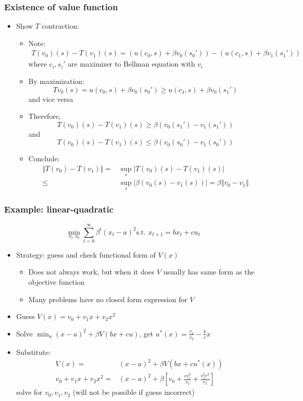 \documentclass[compress]{beamer}
\newcommand{\norm}[1]{\left\Vert {#1} \right\Vert}
\begin{document}
\begin{frame}  \frametitle{Existence of value function}
  \begin{itemize}
  \item Show $T$ contraction: 
    \begin{itemize}
    \item Note:
      \begin{align*}
        T(v_0)(s)-T(v_1)(s) =  \left(u(c_0,s) + \beta v_0(s_0')  \right) -
        \left(u(c_1,s) + \beta v_1(s_1')  \right)
      \end{align*} 
      where $c_i,s_i'$ are maximizer to Bellman equation with $v_i$
    \item By maximization: 
      \[ T v_0 (s) = u(c_0,s) + \beta v_0(s_0')  \geq u(c_1,s) + \beta
      v_0(s_1') \] 
      and vice versa
    \item 
      Therefore, 
      \[ T(v_0)(s) - T(v_1)(s) \geq \beta (v_0(s_1') - v_1(s_1')) \]
      and
      \[ T(v_0)(s)-T(v_1)(s) \leq \beta (v_0(s_0') - v_1(s_0'))  \]
    \item Conclude:
      \begin{align*}
        \norm{T(v_0)-T(v_1)} = & \sup_{s} \left\vert T(v_0)(s)-T(v_1)(s) \right\vert \\
        \leq & \sup_s \left\vert \beta(v_0(s) -v_1(s)) \right\vert =
        \beta \norm{v_0 - v_1}
      \end{align*}
    \end{itemize}
  \end{itemize}
\end{frame}

\begin{frame} \frametitle{Example: linear-quadratic}
  \[ \min_{x_t,u_t} \sum_{t=0}^\infty \beta^t (x_t - a)^2 \text{
    s.t. } x_{t+1} = b x_t + c u_t \]
  \begin{itemize}
  \item Strategy: guess and check functional form of $V(x)$ 
    \begin{itemize}
    \item Does not always work, but when it does $V$ usually has same
      form as the objective function
    \item Many problems have no closed form expression for $V$
    \end{itemize}
  \item Guess $V(x) = v_0 + v_1 x + v_2 x^2$
  \item Solve $\min_u (x-a)^2 + \beta V(bx + c u)$, get $u^\ast(x) =
    \frac{v_1}{v_2} - \frac{b}{c} x$
  \item Substitute:
    \begin{align*}
      V(x) = & (x-a)^2 + \beta V(bx+cu^\ast(x)) \\
      v_0 + v_1 x + v_2 x^2 = & (x-a)^2 + \beta\left[ v_0 + \frac{c
          v_1^2}{v_2} + \frac{v_1^2 c^2}{v_2} \right]
    \end{align*}
    solve for $v_0, v_1, v_2$ (will not be possible if guess incorrect)
  \end{itemize}
\end{frame}
\end{document}
